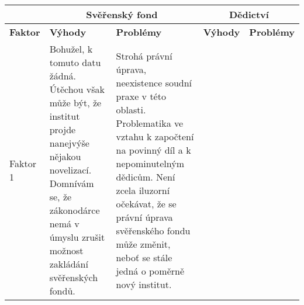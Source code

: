 \documentclass{article}
\begin{document}
\noindent\begin{tabularx}{\textwidth}{X|X|X|X|X|}
\cline{2-5}
                               & \multicolumn{2}{c|}{Svěřenský fond} & \multicolumn{2}{c|}{Dědictví} \\ \hline
\multicolumn{1}{|l|}{\textbf{Faktor}}   & \textbf{Výhody}           & \textbf{Problémy}          & \textbf{Výhody}        & \textbf{Problémy}       \\ \hline
\multicolumn{1}{|l|}{Faktor 1} &         


Bohužel, k tomuto datu žádná. Útěchou však může být, že institut projde nanejvýše nějakou novelizací. Domnívám se, že zákonodárce nemá v úmyslu zrušit možnost zakládání svěřenských fondů.


&      Strohá právní úprava, neexistence soudní praxe v této oblasti.
Problematika ve vztahu k započtení na povinný díl a k nepominutelným dědicům. Není zcela iluzorní očekávat, že se právní úprava svěřenského fondu může změnit, neboť se stále jedná o poměrně nový institut.  



\end{tabularx}
\end{document}
